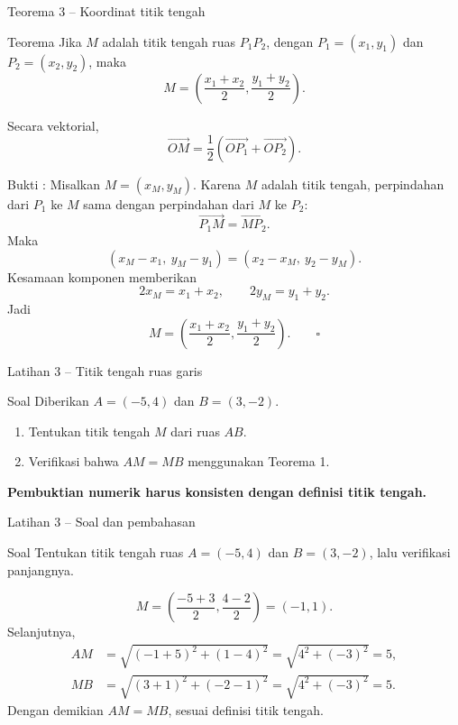 \documentclass[aspectratio=169,11pt]{beamer}
\begin{document}
\begin{frame}{Teorema 3 -- Koordinat titik tengah}
    \begin{block}{Teorema}
        Jika $M$ adalah titik tengah ruas $P_1P_2$, dengan
        $P_1=(x_1,y_1)$ dan $P_2=(x_2,y_2)$, maka
        \[
            \boxed{M=\left(\frac{x_1+x_2}{2},
            \frac{y_1+y_2}{2}\right)}.
        \]
    \end{block}

    Secara vektorial,
    \[
        \overrightarrow{OM}=\frac12\left(
        \overrightarrow{OP_1}+\overrightarrow{OP_2}\right).
    \]
    
\end{frame}

\begin{frame}{Bukti :}
    Misalkan $M=(x_M,y_M)$. Karena $M$ adalah titik tengah, perpindahan
    dari $P_1$ ke $M$ sama dengan perpindahan dari $M$ ke $P_2$:
    \[
        \overrightarrow{P_1M}=\overrightarrow{MP_2}.
    \]
    Maka
    \[
        (x_M-x_1,\ y_M-y_1)=(x_2-x_M,\ y_2-y_M).
    \]
    Kesamaan komponen memberikan
    \[
        2x_M=x_1+x_2,
        \qquad
        2y_M=y_1+y_2.
    \]
    Jadi
    \[
        M=\left(\frac{x_1+x_2}{2},\frac{y_1+y_2}{2}\right).
        \qquad\square
    \]
\end{frame}

\begin{frame}{Latihan 3 -- Titik tengah ruas garis}
    \begin{block}{Soal}
        Diberikan $A=(-5,4)$ dan $B=(3,-2)$.
        \begin{enumerate}
            \item Tentukan titik tengah $M$ dari ruas $AB$.
            \item Verifikasi bahwa $AM=MB$ menggunakan Teorema 1.
        \end{enumerate}
    \end{block}
    \vspace{0.35cm}
    \centering
    \color{AcademicBlue}\bfseries Pembuktian numerik harus konsisten dengan definisi titik tengah.
\end{frame}

\begin{frame}{Latihan 3 -- Soal dan pembahasan}
    \begin{exampleblock}{Soal}
        Tentukan titik tengah ruas $A=(-5,4)$ dan $B=(3,-2)$, lalu verifikasi panjangnya.
    \end{exampleblock}

    \[
        M=\left(\frac{-5+3}{2},\frac{4-2}{2}\right)=\boxed{(-1,1)}.
    \]
    Selanjutnya,
    \[
    \begin{aligned}
        AM&=\sqrt{(-1+5)^2+(1-4)^2}=\sqrt{4^2+(-3)^2}=5,\\
        MB&=\sqrt{(3+1)^2+(-2-1)^2}=\sqrt{4^2+(-3)^2}=5.
    \end{aligned}
    \]
    Dengan demikian $AM=MB$, sesuai definisi titik tengah.
\end{frame}
\end{document}
